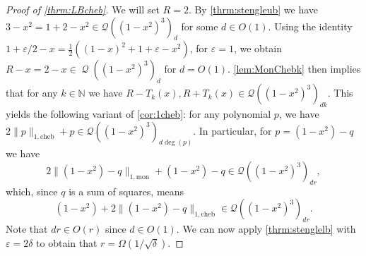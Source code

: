 \documentclass[11pt]{article}
\newcommand{\N}{\mathbb{N}}
\newcommand{\mQ}{\operatorname{\mathcal Q}}
\renewcommand{\epsilon}{\varepsilon}
\newcommand{\eps}{\epsilon}
\theoremstyle{definition}
\newcommand{\mon}{{1,\mathrm{mon}}}
\newcommand{\cheb}{{1,\mathrm{cheb}}}
\begin{document}
\begin{proof}[Proof of \cref{thrm:LBcheb}]
    We will set $R=2$. By \cref{thrm:stengleub} we have $3-x^2 = 1+2-x^2 \in \mathcal Q((1-x^2)^3)_d$ for some $d \in O(1)$. Using the identity $1+ \eps/2- x = \tfrac 12((1 - x)^2 + 1+\eps - x^2)$, for $\eps=1$, we obtain $R-x=2-x \in  \mQ((1-x^2)^3)_{d}$ for $d=O(1)$. %
    \cref{lem:MonChebk} then implies that for any $k \in \N$ we have $R - T_k(x),R+T_k(x) \in \mathcal Q((1-x^2)^3)_{dk}$.
    This yields the following variant of \cref{cor:1cheb}: for any polynomial $p$, we have $2\|p\|_\cheb +p \in \mathcal{Q}((1-x^2)^3)_{d\deg(p)}$. In particular, for $p = (1-x^2) -q$ we have
    \[
    2\|(1-x^2) -q\|_\mon + (1-x^2) -q \in \mathcal{Q}((1-x^2)^3)_{dr},
    \]
which, since $q$ is a sum of squares,  means
\[
(1-x^2) +2\|(1-x^2) -q\|_\cheb  \in \mathcal{Q}((1-x^2)^3)_{dr}.
\]
Note that $dr \in O(r)$ since $d \in O(1)$. We can now apply \cref{thrm:stenglelb} with $\eps = 2 \delta$ to obtain that $r = \Omega(1/\sqrt{\delta})$.
\end{proof}
\end{document}

